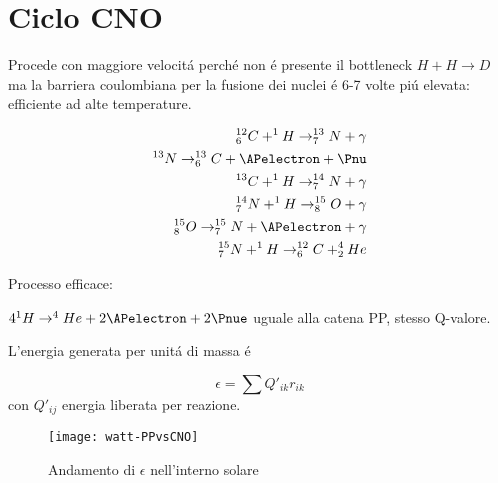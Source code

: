 \documentclass[../main.tex]{subfiles}
\begin{document}
\section{Ciclo CNO}
Procede con maggiore velocit\'a perch\'e non \'e presente il bottleneck $H+H\to D$ ma la barriera coulombiana per la fusione dei nuclei \'e 6-7 volte pi\'u elevata: efficiente ad alte temperature.

\begin{align*}
^{12}_6C+^1H\to^{13}_7N+\gamma\\
^{13}N\to ^{13}_6C+\APelectron+\Pnu\\
^{13}C+^1H\to ^{14}_7N+\gamma\\
^{14}_7N+^1H\to ^{15}_8O+\gamma\\
^{15}_8O\to ^{15}_7N+\APelectron+\gamma\\
^{15}_7N+^1H\to ^{12}_6C+^4_2He
\end{align*}

Processo efficace:

$4^1H\to ^4He+2\APelectron+2\Pnue$ uguale alla catena PP, stesso Q-valore.


L'energia generata per unit\'a di massa \'e

\begin{equation}
\epsilon=\sum Q'_{ik}r_{ik}
\end{equation}
con $Q'_{ij}$ energia liberata per reazione.

\begin{figure}
    \centering
    \texttt{[image: watt-PPvsCNO]}
    \caption{Andamento di $\epsilon$ nell'interno solare}
\end{figure}
\end{document}
